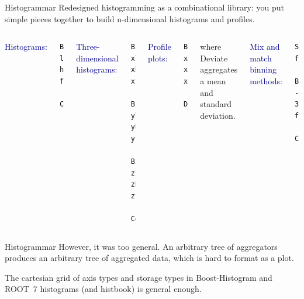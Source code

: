 \documentclass[aspectratio=169]{beamer}
\begin{document}
\begin{frame}[fragile]{Histogrammar}
\large
\vspace{0.5 cm}
Redesigned histogramming as a combinational library: you put simple pieces together to build n-dimensional histograms and profiles.

\vspace{1 cm}

\begin{columns}[t]
\small
\textcolor{darkblue}{\normalsize Histograms:}
\begin{verbatim}
Bin(num, low, high, fillRule,
  Count())
\end{verbatim}

\vspace{0.25 cm}
\textcolor{darkblue}{\normalsize Three-dimensional histograms:}
\begin{verbatim}
Bin(xnum, xlow, xhigh, xfill,
  Bin(ynum, ylow, yhigh, yfill,
    Bin(znum, zlow, zhigh, zfill,
      Count()))
\end{verbatim}

\textcolor{darkblue}{\normalsize Profile plots:}
\small
\begin{verbatim}
Bin(xnum, xlow, xhigh, xfill,
  Deviate(yfill))
\end{verbatim}

{\small where {\ttfamily\small Deviate} aggregates a mean and standard deviation.}

\vspace{0.25 cm}
\textcolor{darkblue}{\normalsize Mix and match binning methods:}
\small
\begin{verbatim}
SparselyBin(0.01, filleta,
  Bin(314, -3.14, 3.14, fillphi,
    Count()))
\end{verbatim}
\end{columns}
\end{frame}

\begin{frame}{Histogrammar}
\large
\vspace{0.5 cm}
However, it was too general. An arbitrary tree of aggregators produces an arbitrary tree of aggregated data, which is hard to format as a plot.

\vspace{1 cm}
The cartesian grid of axis types and storage types in Boost-Histogram and ROOT~7 histograms (and histbook) is general enough.
\end{frame}
\end{document}
